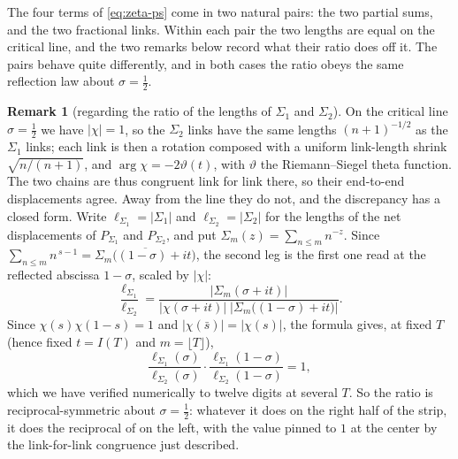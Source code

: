 \documentclass[11pt]{article}
\theoremstyle{definition}
\newtheorem{remark}[theorem]{Remark}
\begin{document}
The four terms of \eqref{eq:zeta-ps} come in two natural pairs: the two
partial sums, and the two fractional links. Within each pair the two lengths
are equal on the critical line, and the two remarks below record what their
ratio does off it. The pairs behave quite differently, and in both cases the
ratio obeys the same reflection law about $\sigma=\tfrac12$.

\begin{remark}[regarding the ratio of the lengths of $\Sigma_1$ and $\Sigma_2$]\label{rem:leg-ratio}
On the critical line $\sigma=\tfrac12$ we have $|\chi|=1$, so the $\Sigma_2$ links
have the same lengths $(n+1)^{-1/2}$ as the $\Sigma_1$ links; each link is then a
rotation composed with a uniform link-length shrink $\sqrt{n/(n+1)}$, and
$\arg\chi=-2\vartheta(t)$, with $\vartheta$ the Riemann--Siegel theta function.
The two chains are thus congruent link for link there, so their end-to-end
displacements agree. Away from the line they do not, and the discrepancy has a
closed form. Write $\ell_{\Sigma_1}=|\Sigma_1|$ and $\ell_{\Sigma_2}=|\Sigma_2|$
for the lengths of the net displacements of $P_{\Sigma_1}$ and $P_{\Sigma_2}$,
and put $\Sigma_m(z)=\sum_{n\le m}n^{-z}$. Since
$\sum_{n\le m}n^{\,s-1}=\overline{\Sigma_m\bigl((1-\sigma)+it\bigr)}$, the
second leg is the first one read at the reflected abscissa $1-\sigma$, scaled
by $|\chi|$:
\begin{equation}\label{eq:leg-ratio}
\frac{\ell_{\Sigma_1}}{\ell_{\Sigma_2}}
=
\frac{\bigl|\Sigma_m(\sigma+it)\bigr|}
     {\bigl|\chi(\sigma+it)\bigr|\;
      \bigl|\Sigma_m\bigl((1-\sigma)+it\bigr)\bigr|}.
\end{equation}
Since $\chi(s)\chi(1-s)=1$ and $|\chi(\bar s)|=|\chi(s)|$, the formula gives,
at fixed $T$ (hence fixed $t=I(T)$ and $m=\lfloor T\rfloor$),
\begin{equation}\label{eq:leg-ratio-symmetry}
\frac{\ell_{\Sigma_1}(\sigma)}{\ell_{\Sigma_2}(\sigma)}
\cdot
\frac{\ell_{\Sigma_1}(1-\sigma)}{\ell_{\Sigma_2}(1-\sigma)}
=
1,
\end{equation}
which we have verified numerically to twelve digits at several $T$. So the
ratio is reciprocal-symmetric about $\sigma=\tfrac12$: whatever it does on the
right half of the strip, it does the reciprocal of on the left, with the value
pinned to $1$ at the center by the link-for-link congruence just described.
\end{remark}
\end{document}
